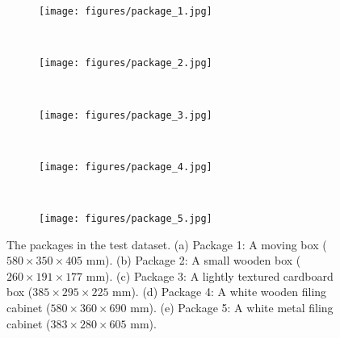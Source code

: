 \begin{figure}
	\centering
	\begin{subfigure}[b]{0.3\textwidth}
		\texttt{[image: figures/package\_1.jpg]}
		\caption{}
		\label{fig:package_1}
	\end{subfigure}%
	~~~ %
	\begin{subfigure}[b]{0.3\textwidth}
		\texttt{[image: figures/package\_2.jpg]}
		\caption{}
		\label{fig:package_2}
	\end{subfigure}
	\vspace{3mm}\\
	\begin{subfigure}[b]{0.3\textwidth}
		\texttt{[image: figures/package\_3.jpg]}
		\caption{}
		\label{fig:package_3}
	\end{subfigure}
	~~~
	\begin{subfigure}[b]{0.3\textwidth}
		\texttt{[image: figures/package\_4.jpg]}
		\caption{}
		\label{fig:package_4}
	\end{subfigure}
	\vspace{3mm}\\
	\begin{subfigure}[b]{0.3\textwidth}
		\texttt{[image: figures/package\_5.jpg]}
		\caption{}
		\label{fig:package_5}
	\end{subfigure}
	\caption{The packages in the test dataset. (a) Package 1: A moving box ($580 \times 350 \times 405$ mm). (b) Package 2: A small wooden box ($260 \times 191 \times 177$ mm). (c) Package 3: A lightly textured cardboard box ($385 \times 295 \times 225$ mm). (d) Package 4: A white wooden filing cabinet ($580 \times 360 \times 690$ mm). (e) Package 5: A white metal filing cabinet ($383 \times 280 \times 605$ mm).}\label{fig:packages}
\end{figure}